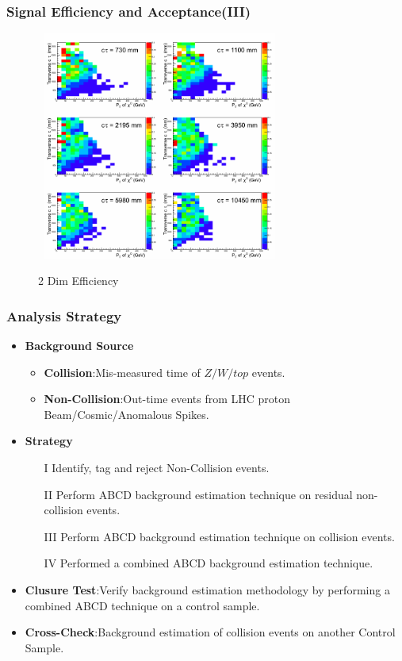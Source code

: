 \documentclass{beamer}
\begin{document}
\begin{frame}
\frametitle{Signal Efficiency and Acceptance(III)}
  \begin{figure}[ht]
   \begin{minipage}[b]{0.7\linewidth}
    \mbox{
  \centering
  \includegraphics[height=7.5cm, width=0.65\paperwidth]{THESISPLOTS/Eff180_xPt_ct.png} }
    \vspace{-0.5cm}
    \caption{2 Dim Efficiency}
  \end{minipage}
 \end{figure}
\end{frame}

\begin{frame}
\frametitle{Analysis Strategy}
\begin{itemize}
 \item \textcolor{UMN@Maroon}{\textbf{Background Source}}
  \begin{itemize}
   \item \textbf{Collision}:Mis-measured time of $Z/W/top$ events.
   \item \textbf{Non-Collision}:Out-time events from LHC proton Beam/Cosmic/Anomalous Spikes.
  \end{itemize}
 \item \textcolor{UMN@Maroon}{\textbf{Strategy}}
   \begin{enumerate}
    \item[I] Identify, tag and reject Non-Collision events.
    \item[II] Perform ABCD background estimation technique on residual non-collision events.
    \item[III]Perform ABCD background estimation technique on collision events.
    \item[IV] Performed a combined ABCD background estimation technique. 
    \end{enumerate}
 \item \textcolor{UMN@Maroon}{\textbf{Clusure Test}}:Verify background estimation methodology by performing a combined ABCD technique on a control sample.
 \item \textcolor{UMN@Maroon}{\textbf{Cross-Check}}:Background estimation of collision events on another Control Sample.
\end{itemize}  
\end{frame}
\end{document}
